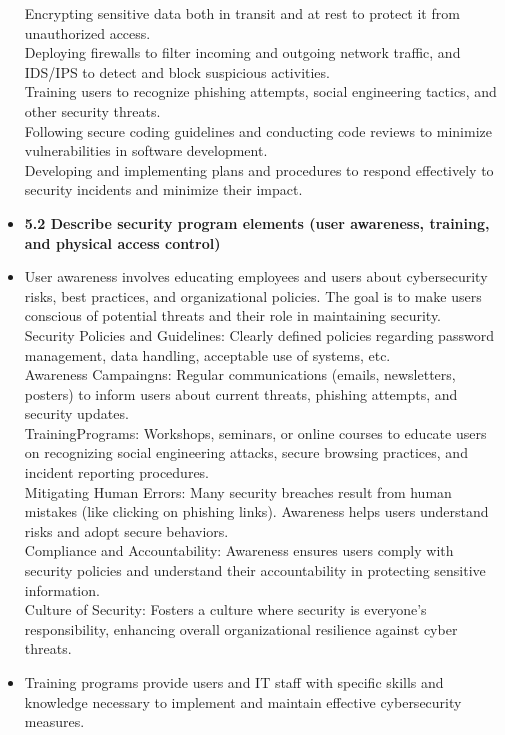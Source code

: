 \documentclass{article}
\begin{document}
\begin{itemize}
	Encrypting sensitive data both in transit and at rest to protect it from unauthorized access.\\
	Deploying firewalls to filter incoming and outgoing network traffic, and IDS/IPS to detect and block suspicious activities.\\
	Training users to recognize phishing attempts, social engineering tactics, and other security threats.\\
	Following secure coding guidelines and conducting code reviews to minimize vulnerabilities in software development.\\
	Developing and implementing plans and procedures to respond effectively to security incidents and minimize their impact.
  
  \item \textbf{5.2 Describe security program elements (user awareness, training, and physical access control)}
  	\item[] User awareness involves educating employees and users about cybersecurity risks, best practices, and organizational policies. The goal is to make users conscious of potential threats and their role in maintaining security.\\ 
	Security Policies and Guidelines: Clearly defined policies regarding password management, data handling, acceptable use of systems, etc.\\
	Awareness Campaingns: Regular communications (emails, newsletters, posters) to inform users about current threats, phishing attempts, and security updates.\\
	TrainingPrograms: Workshops, seminars, or online courses to educate users on recognizing social engineering attacks, secure browsing practices, and incident reporting procedures.\\
	Mitigating Human Errors: Many security breaches result from human mistakes (like clicking on phishing links). Awareness helps users understand risks and adopt secure behaviors.\\
	Compliance and Accountability: Awareness ensures users comply with security policies and understand their accountability in protecting sensitive information.\\
	Culture of Security: Fosters a culture where security is everyone's responsibility, enhancing overall organizational resilience against cyber threats.
	\item[] Training programs provide users and IT staff with specific skills and knowledge necessary to implement and maintain effective cybersecurity measures.\\

\end{itemize}
\end{document}
